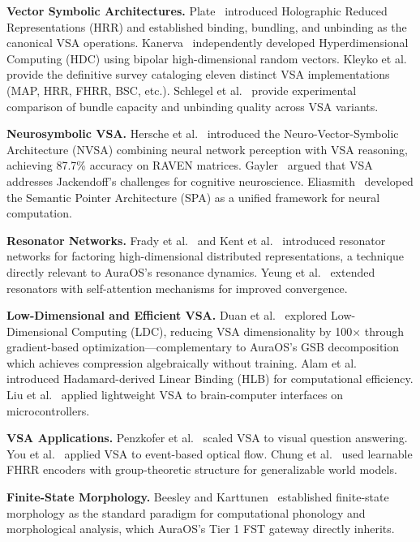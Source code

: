 \documentclass[11pt]{article}
\begin{document}
\textbf{Vector Symbolic Architectures.} Plate~\cite{plate1995holographic,plate2003holographic} introduced Holographic Reduced Representations (HRR) and established binding, bundling, and unbinding as the canonical VSA operations. Kanerva~\cite{kanerva2009hyperdimensional,kanerva2022hyperdimensional} independently developed Hyperdimensional Computing (HDC) using bipolar high-dimensional random vectors. Kleyko et al.~\cite{kleyko2022vsa} provide the definitive survey cataloging eleven distinct VSA implementations (MAP, HRR, FHRR, BSC, etc.). Schlegel et al.~\cite{schlegel2021comparison} provide experimental comparison of bundle capacity and unbinding quality across VSA variants.

\textbf{Neurosymbolic VSA.} Hersche et al.~\cite{hersche2022nvsa} introduced the Neuro-Vector-Symbolic Architecture (NVSA) combining neural network perception with VSA reasoning, achieving 87.7\% accuracy on RAVEN matrices. Gayler~\cite{gayler2003vsaconnectionist} argued that VSA addresses Jackendoff's challenges for cognitive neuroscience. Eliasmith~\cite{eliasmith2013spa} developed the Semantic Pointer Architecture (SPA) as a unified framework for neural computation.

\textbf{Resonator Networks.} Frady et al.~\cite{frady2020resonator} and Kent et al.~\cite{kent2020resonator2} introduced resonator networks for factoring high-dimensional distributed representations, a technique directly relevant to AuraOS's resonance dynamics. Yeung et al.~\cite{yeung2024selfattention} extended resonators with self-attention mechanisms for improved convergence.

\textbf{Low-Dimensional and Efficient VSA.} Duan et al.~\cite{duan2025lowdim} explored Low-Dimensional Computing (LDC), reducing VSA dimensionality by 100$\times$ through gradient-based optimization—complementary to AuraOS's GSB decomposition which achieves compression algebraically without training. Alam et al.~\cite{alam2024hadamard} introduced Hadamard-derived Linear Binding (HLB) for computational efficiency. Liu et al.~\cite{liu2024scheduled} applied lightweight VSA to brain-computer interfaces on microcontrollers.

\textbf{VSA Applications.} Penzkofer et al.~\cite{penzkofer2024vsa4vqa} scaled VSA to visual question answering. You et al.~\cite{you2024vsaflow} applied VSA to event-based optical flow. Chung et al.~\cite{chung2026geometric} used learnable FHRR encoders with group-theoretic structure for generalizable world models.

\textbf{Finite-State Morphology.} Beesley and Karttunen~\cite{beesley2003fst} established finite-state morphology as the standard paradigm for computational phonology and morphological analysis, which AuraOS's Tier 1 FST gateway directly inherits.
\end{document}
